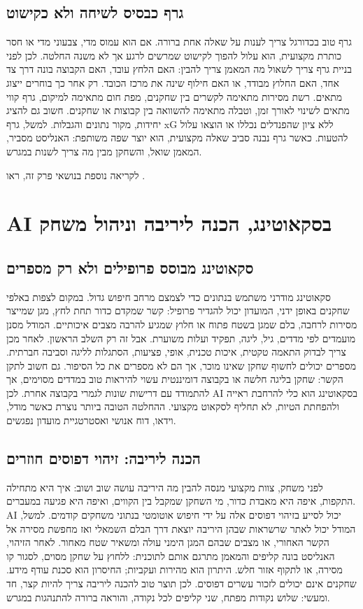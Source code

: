 \documentclass[11pt]{report}
\begin{document}
\section{גרף כבסיס לשיחה ולא כקישוט}
גרף טוב בכדורגל צריך לענות על שאלה אחת ברורה. אם הוא עמוס מדי, צבעוני מדי או חסר כותרת מקצועית, הוא עלול להפוך לקישוט שמרשים לרגע אך לא משנה החלטה. לכן לפני בניית גרף צריך לשאול מה המאמן צריך להבין: האם הלחץ עובד, האם הקבוצה בונה דרך צד אחד, האם החלוץ מבודד, או האם חילוף שינה את מרכז הכובד. רק אחר כך בוחרים ייצוג מתאים. רשת מסירות מתאימה לקשרים בין שחקנים, מפת חום מתאימה למיקום, גרף קווי מתאים לשינוי לאורך זמן, וטבלה מתאימה להשוואה בין קבוצות או שחקנים. חשוב גם להציג יחידות, מקור נתונים והגבלות. למשל, גרף xG ללא ציון שהפנדלים נכללו או הוצאו עלול להטעות. כאשר גרף נבנה סביב שאלה מקצועית, הוא יוצר שפה משותפת: האנליסט מסביר, המאמן שואל, והשחקן מבין מה צריך לשנות במגרש.

לקריאה נוספת בנושאי פרק זה, ראו \cite{crewai_docs}.

\chapter{AI בסקאוטינג, הכנה ליריבה וניהול משחק}
\section{סקאוטינג מבוסס פרופילים ולא רק מספרים}
סקאוטינג מודרני משתמש בנתונים כדי לצמצם מרחב חיפוש גדול. במקום לצפות באלפי שחקנים באופן ידני, המועדון יכול להגדיר פרופיל: קשר שמקדם כדור תחת לחץ, מגן שמייצר מסירות לרחבה, בלם שמגן בשטח פתוח או חלוץ שמגיע להרבה מצבים איכותיים. המודל מסנן מועמדים לפי מדדים, גיל, ליגה, תפקיד ועלות משוערת. אבל זה רק השלב הראשון. לאחר מכן צריך לבדוק התאמה טקטית, איכות טכנית, אופי, פציעות, הסתגלות לליגה וסביבה חברתית. מספרים יכולים לחשוף שחקן שאינו מוכר, אך הם לא מספרים את כל הסיפור. גם חשוב לתקן הקשר: שחקן בליגה חלשה או בקבוצה דומיננטית עשוי להיראות טוב במדדים מסוימים, אך להתמודד עם דרישות שונות לגמרי בקבוצה אחרת. לכן AI בסקאוטינג הוא כלי להרחבת ראייה ולהפחתת הטיות, לא תחליף לסקאוט מקצועי. ההחלטה הטובה ביותר נוצרת כאשר מודל, וידאו, דוח אנושי ואסטרטגיית מועדון נפגשים.

\section{הכנה ליריבה: זיהוי דפוסים חוזרים}
לפני משחק, צוות מקצועי מנסה להבין מה היריבה עושה שוב ושוב: איך היא מתחילה התקפות, איפה היא מאבדת כדור, מי השחקן שמקבל בין הקווים, ואיפה היא פגיעה במעברים. AI יכול לסייע בזיהוי דפוסים אלה על ידי חיפוש אוטומטי בנתוני משחקים קודמים. למשל, המודל יכול לאתר שרשראות שבהן היריבה יוצאת דרך הבלם השמאלי ואז מחפשת מסירה אל הקשר האחורי, או מצבים שבהם המגן הימני עולה ומשאיר שטח מאחור. לאחר הזיהוי, האנליסט בונה קליפים והמאמן מתרגם אותם לתוכנית: ללחוץ על שחקן מסוים, לסגור קו מסירה, או לתקוף אזור חלש. היתרון הוא מהירות ועקביות; החיסרון הוא סכנת עודף מידע. שחקנים אינם יכולים לזכור עשרים דפוסים. לכן תוצר טוב להכנה ליריבה צריך להיות קצר, חד ומעשי: שלוש נקודות מפתח, שני קליפים לכל נקודה, והוראה ברורה להתנהגות במגרש.
\end{document}
